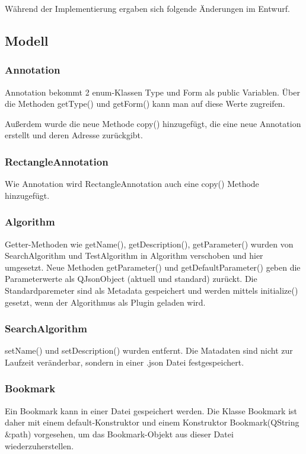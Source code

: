 Während der Implementierung ergaben sich folgende Änderungen im Entwurf.

\subsection{Modell}
\subsubsection{Annotation}
Annotation bekommt 2 enum-Klassen Type und Form als public Variablen. Über die Methoden getType() und getForm() kann man auf diese Werte zugreifen.

Außerdem wurde die neue Methode copy() hinzugefügt, die eine neue Annotation erstellt und deren Adresse zurückgibt. 

\subsubsection{RectangleAnnotation}
Wie Annotation wird RectangleAnnotation auch eine copy() Methode hinzugefügt.

\subsubsection{Algorithm}
Getter-Methoden wie getName(), getDescription(), getParameter() wurden von SearchAlgorithm und TestAlgorithm in Algorithm verschoben und hier umgesetzt. 
Neue Methoden getParameter() und getDefaultParameter() geben die Parameterwerte als QJsonObject (aktuell und standard) zurückt. Die Standardparemeter sind als Metadata gespeichert und werden mittels initialize() gesetzt, wenn der Algorithmus als Plugin geladen wird.

\subsubsection{SearchAlgorithm}
setName() und setDescription() wurden entfernt. Die Matadaten sind nicht zur Laufzeit veränderbar, sondern in einer .json Datei festgespeichert.

\subsubsection{Bookmark}
Ein Bookmark kann in einer Datei gespeichert werden. Die Klasse Bookmark ist daher mit einem default-Konstruktor und einem Konstruktor Bookmark(QString &path) vorgesehen, um das Bookmark-Objekt aus dieser Datei wiederzuherstellen.

